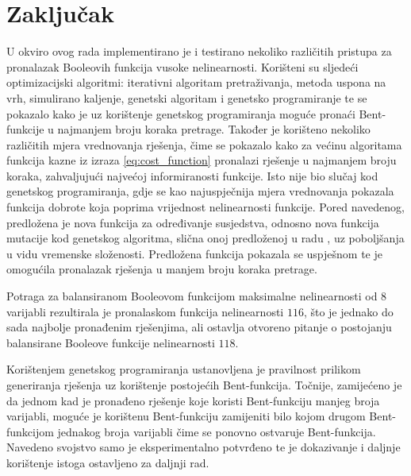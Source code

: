 \chapter{Zaključak}

U okviro ovog rada implementirano je i testirano nekoliko različitih pristupa za pronalazak Booleovih funkcija vusoke nelinearnosti.
Korišteni su sljedeći optimizacijski algoritmi: iterativni algoritam pretraživanja, metoda uspona na vrh, simulirano kaljenje, genetski algoritam i genetsko programiranje te se pokazalo kako je uz korištenje genetskog programiranja moguće pronaći Bent-funkcije u najmanjem broju koraka pretrage.
Također je korišteno nekoliko različitih mjera vrednovanja rješenja, čime se pokazalo kako za većinu algoritama funkcija kazne iz izraza \eqref{eq:cost_function} pronalazi rješenje u najmanjem broju koraka, zahvaljujući najvećoj informiranosti funkcije.
Isto nije bio slučaj kod genetskog programiranja, gdje se kao najuspječnija mjera vrednovanja pokazala funkcija dobrote koja poprima vrijednost nelinearnosti funkcije.
Pored navedenog, predložena je nova funkcija za određivanje susjedstva, odnosno nova funkcija mutacije kod genetskog algoritma, slična onoj predloženoj u radu \cite{millan1997smart}, uz poboljšanja u vidu vremenske složenosti.
Predložena funkcija pokazala se uspješnom te je omogućila pronalazak rješenja u manjem broju koraka pretrage.

Potraga za balansiranom Booleovom funkcijom maksimalne nelinearnosti od $8$ varijabli rezultirala je pronalaskom funkcija nelinearnosti $116$, što je jednako do sada najbolje pronađenim rješenjima, ali ostavlja otvoreno pitanje o postojanju balansirane Booleove funkcije nelinearnosti $118$. 

Korištenjem genetskog programiranja ustanovljena je pravilnost prilikom generiranja rješenja uz korištenje postojećih Bent-funkcija.
Točnije, zamijećeno je da jednom kad je pronađeno rješenje koje koristi Bent-funkciju manjeg broja varijabli, moguće je korištenu Bent-funkciju zamijeniti bilo kojom drugom Bent-funkcijom jednakog broja varijabli čime se ponovno ostvaruje Bent-funkcija.
Navedeno svojstvo samo je eksperimentalno potvrđeno te je dokazivanje i daljnje korištenje istoga ostavljeno za daljnji rad.
